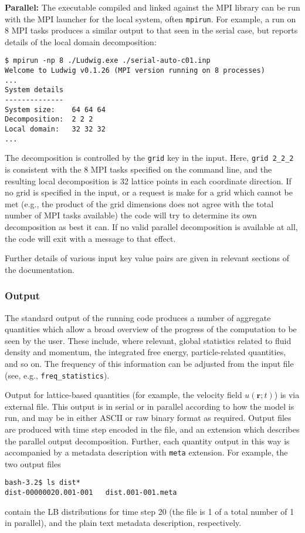 \textbf{Parallel: }
The executable compiled and linked against the MPI library can
be run with the MPI launcher for the local system, often
\texttt{mpirun}. For example, a run on 8 MPI tasks produces a
similar output to that seen in the serial case, but reports
details of the local domain decomposition:
\begin{lstlisting}
$ mpirun -np 8 ./Ludwig.exe ./serial-auto-c01.inp
Welcome to Ludwig v0.1.26 (MPI version running on 8 processes)
...
System details
--------------
System size:    64 64 64
Decomposition:  2 2 2
Local domain:   32 32 32
...
\end{lstlisting}
The decomposition is controlled by the \texttt{grid} key in
the input. Here, \texttt{grid 2\_2\_2} is consistent with the
8 MPI tasks specified on the command line, and the resulting
local decomposition is 32 lattice points in each coordinate direction.
If no grid is specified in the input, or a request is
make for a grid which cannot be met (e.g., the product
of the grid dimensions does not agree with the total number
of MPI tasks available)
the code will try to determine its own decomposition as best
it can. If no valid parallel decomposition is available at all,
the code will exit with a message to that effect.

Further details of various input key value pairs are given in
relevant sections of the documentation.

\subsubsection{Output}

The standard output of the running code produces a number of
aggregate quantities which allow a broad overview of the progress
of the computation to be seen by the user. These include, where
relevant, global statistics related to fluid density and momentum,
the integrated free energy, particle-related quantities, and so on.
The frequency of this information can be adjusted from the input
file (see, e.g., \texttt{freq\_statistics}).

Output for lattice-based quantities (for example, the velocity field
$u(\mathbf{r}; t)$) is via external file. This output is in serial
or in parallel according to how the model is run, and may be in
either ASCII or raw binary format as required. Output files are produced
with time step encoded in the file, and an extension which describes the
parallel output decomposition. Further, each quantity output in this way
is accompanied by a metadata description with \texttt{meta} extension.
For example, the two output files
\begin{lstlisting}
bash-3.2$ ls dist*
dist-00000020.001-001   dist.001-001.meta
\end{lstlisting}
contain the LB distributions for time step 20 (the file is 1 of a total
number of 1 in parallel), and the plain text metadata description,
respectively.

